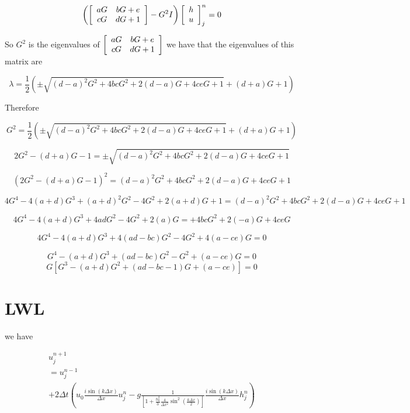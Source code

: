 \documentclass[12pt]{article}
\begin{document}
\[
 \left( \left[\begin{array}{c c}
aG & bG + e \\
cG & dG +1
\end{array} \right] - G^2 I\right)  \left[\begin{array}{c}
h \\
u
\end{array} \right]^{n}_j = 0 
\]

So $G^2$ is the eigenvalues of  $\left[\begin{array}{c c}
aG & bG + e \\
cG & dG +1
\end{array} \right]$ we have that the eigenvalues of this matrix are

\[\lambda = \frac{1}{2}\left(\pm\sqrt{\left(d-a\right)^2G^2 + 4bcG^2 + 2(d-a)G + 4ceG + 1} + (d+a)G + 1 \right)\]

Therefore 

\[G^2 = \frac{1}{2}\left(\pm\sqrt{\left(d-a\right)^2G^2 + 4bcG^2 + 2(d-a)G + 4ceG + 1} + (d+a)G + 1 \right)\]

\[2G^2 - (d+a)G - 1 = \pm\sqrt{\left(d-a\right)^2G^2 + 4bcG^2 + 2(d-a)G + 4ceG + 1}\]

\[\left(2G^2 - (d+a)G - 1\right)^2 = \left(d-a\right)^2G^2 + 4bcG^2 + 2(d-a)G + 4ceG + 1\]

\[4G^4  - 4 (a+d)G^3 + (a+d)^2G^2 - 4G^2 + 2(a+d)G + 1 = \left(d-a\right)^2G^2 + 4bcG^2 + 2(d-a)G + 4ceG + 1\]

\[4G^4  - 4 (a+d)G^3 + 4adG^2 - 4G^2 + 2(a)G = + 4bcG^2 + 2(-a)G + 4ceG\]

\[4G^4  - 4 (a+d)G^3 + 4(ad - bc)G^2 - 4G^2 + 4(a -ce)G = 0 \]

\[G^4  - (a+d)G^3 + (ad - bc)G^2 - G^2 + (a -ce)G = 0 \]
\[G\left[G^3  - (a+d)G^2 + (ad - bc - 1)G + (a -ce) \right]= 0 \]

\newpage
\section{LWL}

we have 

\begin{multline}
u^{n+1}_j 
\\ = u^{n-1}_j   \\ + 2 \Delta t\left(u_0\frac{i \sin\left(k \Delta x\right)}{\Delta x} u^n_j   - g\frac{1}{\left[1 +\frac{h_0^2}{3}\frac{4}{\Delta x^2}\sin^2\left(\frac{k\Delta x}{2}\right) \right]}\frac{i \sin\left(k \Delta x\right)}{\Delta x} h^n_j\right)
\end{multline}
\end{document}
